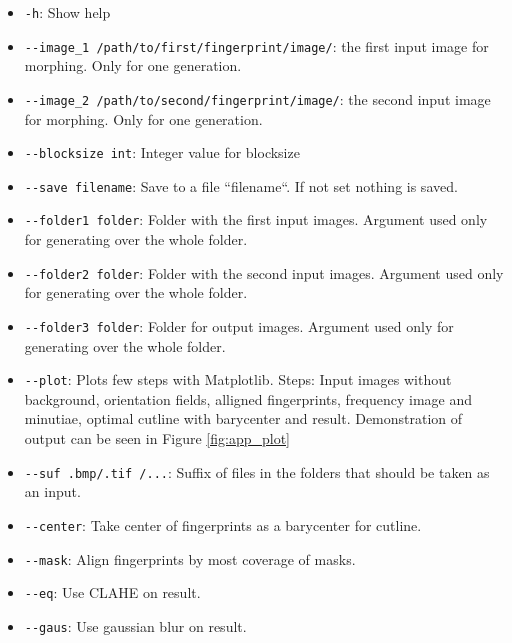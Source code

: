 \begin{itemize}
    \item \texttt{-h}: Show help 
    \item \texttt{-{}-image\_1 /path/to/first/fingerprint/image/}: the first input image for morphing. Only for one generation.
    \item \texttt{-{}-image\_2 /path/to/second/fingerprint/image/}: the second input image for morphing. Only for one generation.
    \item \texttt{-{}-blocksize int}: Integer value for blocksize
    \item \texttt{-{}-save filename}: Save to a file ``filename``. If not set nothing is saved.
    \item \texttt{-{}-folder1 folder}: Folder with the first input images. Argument used only for generating over the whole folder.
    \item \texttt{-{}-folder2 folder}: Folder with the second input images. Argument used only for generating over the whole folder.
    \item \texttt{-{}-folder3 folder}: Folder for output images. Argument used only for generating over the whole folder.
    \item \texttt{-{}-plot}: Plots few steps with Matplotlib. Steps: 
    Input images without background, orientation fields, alligned fingerprints, frequency image and minutiae, optimal cutline with barycenter and result. Demonstration of output can be seen in Figure \ref{fig:app_plot}
	\item \texttt{-{}-suf .bmp/.tif /...}: Suffix of files in the folders that should be taken as an input.
	\item \texttt{-{}-center}: Take center of fingerprints as a barycenter for cutline.
	\item \texttt{-{}-mask}: Align fingerprints by most coverage of masks.
	\item \texttt{-{}-eq}: Use CLAHE on result.
	\item \texttt{-{}-gaus}: Use gaussian blur on result.
\end{itemize}

